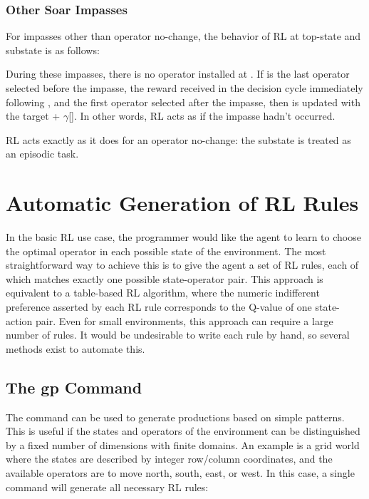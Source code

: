 \subsubsection{Other Soar Impasses}
For impasses other than operator no-change, the behavior of RL at top-state  and substate  is as follows:

\begin{list}{S1}
\item During these impasses, there is no operator installed at .  If  is the last operator selected before the impasse,  the reward received in the decision cycle immediately following , and  the first operator selected after the impasse, then  is updated with the target  + $\gamma$[]. In other words, RL acts as if the impasse hadn't occurred.
\end{list}

\begin{list}{S2}
\item RL acts exactly as it does for an operator no-change: the substate is treated as an episodic task.

\end{list}

\section{Automatic Generation of RL Rules}

In the basic RL use case, the programmer would like the agent to learn to choose the optimal operator in each possible state of the environment.
The most straightforward way to achieve this is to give the agent a set of RL rules, each of which matches exactly one possible state-operator pair.
This approach is equivalent to a table-based RL algorithm, where the numeric indifferent preference asserted by each RL rule corresponds to the Q-value of one state-action pair.
Even for small environments, this approach can require a large number of rules.
It would be undesirable to write each rule by hand, so several methods exist to automate this.

\subsection{The gp Command}
The  command can be used to generate productions based on simple patterns.
This is useful if the states and operators of the environment can be distinguished by a fixed number of dimensions with finite domains.
An example is a grid world where the states are described by integer row/column coordinates, and the available operators are to move north, south, east, or west.
In this case, a single  command will generate all necessary RL rules:
	
